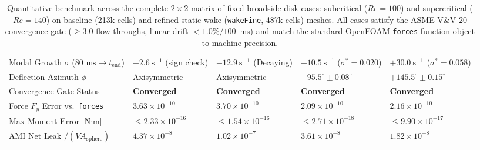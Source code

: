 \documentclass[11pt,a4paper]{article}
\begin{document}
\begin{table}[htbp]
\begin{tabularx}{\textwidth}{>{\raggedright\arraybackslash}p{44mm} >{\centering\arraybackslash}X >{\centering\arraybackslash}X >{\centering\arraybackslash}X >{\centering\arraybackslash}X}
Modal Growth $\sigma$ ($80\text{ ms} \to t_{\mathrm{end}}$) & $-2.6\ \mathrm{s}^{-1}$ (sign check) & $\mathbf{-12.9\ \mathrm{s}^{-1}}$ (Decaying) & $+10.5\ \mathrm{s}^{-1}$ ($\sigma^* = 0.020$) & $\mathbf{+30.0\ \mathrm{s}^{-1}}$ ($\sigma^* = 0.058$) \\
Deflection Azimuth $\phi$ & Axisymmetric & Axisymmetric & $+95.5^\circ \pm 0.08^\circ$ & $+145.5^\circ \pm 0.15^\circ$ \\
Convergence Gate Status & \textbf{Converged} & \textbf{Converged} & \textbf{Converged} & \textbf{Converged} \\
\midrule
Force $F_y$ Error vs.\ \texttt{forces} & $3.63 \times 10^{-10}$ & $3.70 \times 10^{-10}$ & $2.09 \times 10^{-10}$ & $2.16 \times 10^{-10}$ \\
Max Moment Error [N$\cdot$m] & $\le 2.33 \times 10^{-16}$ & $\le 1.54 \times 10^{-16}$ & $\le 2.71 \times 10^{-18}$ & $\le 9.90 \times 10^{-17}$ \\
AMI Net Leak $/ (V A_{\mathrm{sphere}})$ & $4.37 \times 10^{-8}$ & $1.02 \times 10^{-7}$ & $3.61 \times 10^{-8}$ & $1.82 \times 10^{-8}$ \\
\bottomrule
\end{tabularx}
\caption{Quantitative benchmark across the complete $2 \times 2$ matrix of fixed broadside disk cases: subcritical ($Re = 100$) and supercritical ($Re = 140$) on baseline (213k cells) and refined static wake (\texttt{wakeFine}, 487k cells) meshes. All cases satisfy the ASME V\&V 20 convergence gate ($\ge 3.0$ flow-throughs, linear drift $< 1.0\% / 100$~ms) and match the standard OpenFOAM \texttt{forces} function object to machine precision.}
\label{tab:fixed_disk_comparison}
\end{table}
\end{document}
